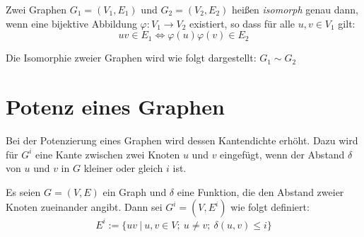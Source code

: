 \begin{mydef}
    Zwei Graphen $G_1 = (V_1,E_1)$ und $G_2 = (V_2,E_2)$ heißen \emph{isomorph} genau dann, wenn eine bijektive Abbildung $\varphi: V_1 \rightarrow V_2$ existiert, so dass für alle $u,v \in V_1$ gilt: \[ uv \in E_1 \Leftrightarrow \varphi(u)\varphi(v) \in E_2 \]
    
    Die Isomorphie zweier Graphen wird wie folgt dargestellt: $G_1 \sim G_2$
\end{mydef}

 
\section{Potenz eines Graphen}

Bei der Potenzierung eines Graphen wird dessen Kantendichte erhöht. Dazu wird für $G^i$ eine Kante zwischen zwei Knoten $u$ und $v$ eingefügt, wenn der Abstand $\delta$ von $u$ und $v$ in $G$ kleiner oder gleich $i$ ist.

\begin{mydef}
    Es seien $G=(V,E)$ ein Graph und $\delta$ eine Funktion, die den Abstand zweier Knoten zueinander angibt. Dann sei $G^i=(V,E^i)$ wie folgt definiert:
    \[ E^i := \{uv \ |\ u,v \in V;\ u \neq v;\ \delta(u,v) \leq i\} \]
\end{mydef}

